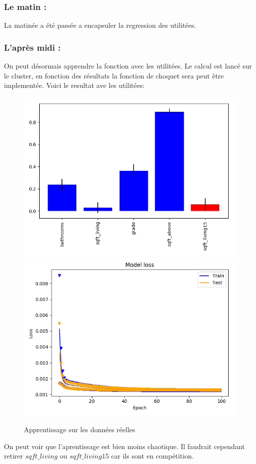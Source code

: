 \subsubsection*{Le matin :}
La matinée a été passée a encapsuler la regression des utilitées.

\subsubsection*{L'après midi :}
On peut désormais apprendre la fonction avec les utilitées.
Le calcul est lancé sur le cluster, en fonction des résultats la fonction de choquet sera peut être implementée.
Voici le resultat ave les utilitées:
\begin{figure}[H]
    \center
    \includegraphics[height=\petit]{sources/data/Obj2/real/graphs/ut1_100_100.png}
    \includegraphics[height=\petit]{sources/data/Obj2/real/graphs/ut1_100_100_learn.png}
	\caption{Apprentissage sur les données réelles}
	\label{ut1_100_100}
\end{figure}
On peut voir que l'aprentissage est bien moins chaotique.
Il faudrait cependant retirer $sqft\_living$ ou $sqft\_living15$
car ils sont en compétition.
